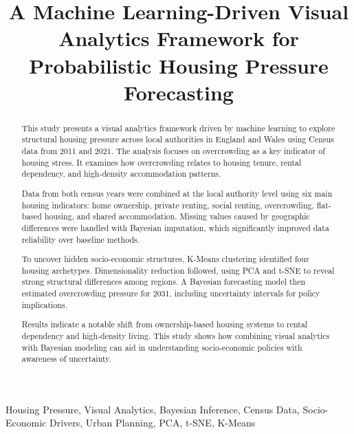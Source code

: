 \documentclass[conference]{IEEEtran}
\begin{document}
\title{A Machine Learning-Driven Visual Analytics Framework for \\ Probabilistic Housing Pressure Forecasting}

\author{
}

\maketitle

\begin{abstract}
This study presents a visual analytics framework driven by machine learning to explore structural housing pressure across local authorities in England and Wales using Census data from 2011 and 2021\cite{noauthor_census_nodate}. The analysis focuses on overcrowding as a key indicator of housing stress. It examines how overcrowding relates to housing tenure, rental dependency, and high-density accommodation patterns.

Data from both census years were combined at the local authority level using six main housing indicators: home ownership, private renting, social renting, overcrowding, flat-based housing, and shared accommodation. Missing values caused by geographic differences were handled with Bayesian imputation, which significantly improved data reliability over baseline methods\cite{davidson-pilon_bayesian_2016}.

To uncover hidden socio-economic structures, K-Means clustering identified four housing archetypes\cite{macqueen_methods_nodate}. Dimensionality reduction followed, using PCA and t-SNE to reveal strong structural differences among regions\cite{lee_generalized_nodate, maaten_visualizing_2008}. A Bayesian forecasting model then estimated overcrowding pressure for 2031, including uncertainty intervals for policy implications.

Results indicate a notable shift from ownership-based housing systems to rental dependency and high-density living. This study shows how combining visual analytics with Bayesian modeling can aid in understanding socio-economic policies with awareness of uncertainty.
\end{abstract}

\begin{IEEEkeywords}
Housing Pressure, Visual Analytics, Bayesian Inference, Census Data, Socio-Economic Drivers, Urban Planning, PCA, t-SNE, K-Means
\end{IEEEkeywords}
\end{document}
